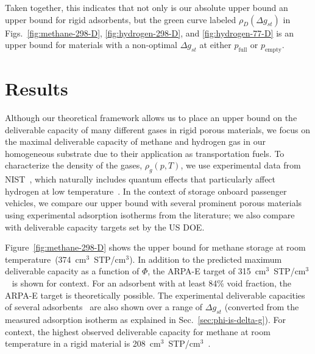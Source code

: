 \documentclass[pre,twocolumn]{revtex4-2}
\newcommand\V{\Phi}
\newcommand\pfull{\ensuremath{p_{\text{full}}}}
\newcommand\pempty{\ensuremath{p_{\text{empty}}}}
\newcommand\gst{\ensuremath{\Delta g_{st}}}
\begin{document}
Taken together, this indicates that not only is our absolute upper bound an
upper bound for rigid adsorbents, but the green curve labeled $\rho_D(\gst)$ in
Figs.~\ref{fig:methane-298-D}, \ref{fig:hydrogen-298-D}, and
\ref{fig:hydrogen-77-D} is an upper bound for materials with a non-optimal
$\gst$ at either $\pfull$ or $\pempty$.


\section{Results}
Although our theoretical framework allows us to place an upper bound on the
deliverable capacity of many different gases in rigid porous materials, we
focus on the maximal deliverable capacity of methane and hydrogen gas in our
homogeneous substrate due to their application as transportation fuels. To
characterize the density of the gases, $\rho_g(p, T)$, we use experimental data
from NIST~\cite{nist}, which naturally includes quantum effects that
particularly affect hydrogen at low temperature~\cite{kumar2006quantum}. In the
context of storage onboard passenger vehicles, we compare our upper bound with
several prominent porous materials using experimental adsorption isotherms from
the literature; we also compare with deliverable capacity targets set by the US
DOE.

Figure~\ref{fig:methane-298-D} shows the upper bound for methane storage at
room temperature~(374~cm$^3$~STP/cm$^3$). In addition to the predicted maximum
deliverable capacity as a function of $\V$, the ARPA-E target of
315~cm$^3$~STP/cm$^3$~\cite{arpaemove} is shown for context. For an adsorbent
with at least 84\% void fraction, the ARPA-E target is theoretically possible.
The experimental deliverable capacities of several
adsorbents~\cite{mason2014evaluating} are also shown over a range of $\gst$
(converted from the measured adsorption isotherm as explained in
Sec.~\ref{sec:phi-is-delta-g}). For context, the highest observed
deliverable capacity for methane at room temperature in a rigid material is 208~cm$^3$~STP/cm$^3$~\cite{simon2015materials}.
\end{document}
